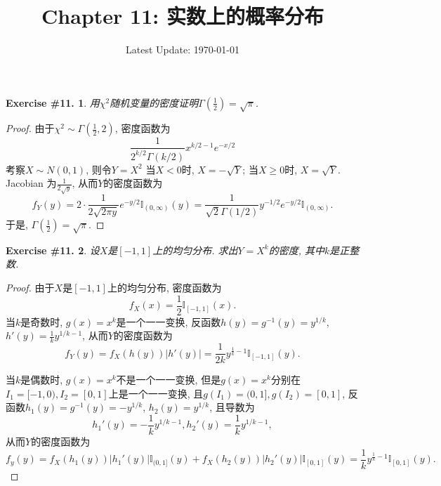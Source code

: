 \documentclass[UTF8, a4paper]{article}
\title{Chapter 11: 实数上的概率分布}
\author{}
\date{Latest Update: \today}
\newtheorem{exercise}{Exercise \#11.}
\begin{document}
\maketitle


\begin{framed}
\begin{exercise}
用\(\chi^2\)随机变量的密度证明\(\Gamma\left(\frac{1}{2}\right) = \sqrt{\pi}\).
\end{exercise}
\end{framed}

\begin{proof}
由于\(\chi^2 \sim \Gamma\left(\frac{1}{2}, 2\right)\), 密度函数为
$$
\frac{1}{2^{k / 2} \Gamma(k / 2)} x^{k / 2-1} e^{-x / 2}
$$
考察\(X \sim N(0, 1)\), 则令\(Y = X^2\)
当\(X < 0\)时, \(X = -\sqrt{Y}\); 当\(X \geq 0\)时, \(X = \sqrt{Y}\).
Jacobian 为\(\frac{1}{2\sqrt{y}}\), 从而\(Y\)的密度函数为
$$
f_Y(y) =2\cdot \frac{1}{2\sqrt{2\pi y}} e^{-y/2} \mathbb{I}_{(0, \infty)}(y) = \frac{1}{\sqrt{2} \Gamma(1/2)} y^{-1/2} e^{-y/2} \mathbb{I}_{(0,\infty)}.
$$
于是, \(\Gamma\left(\frac{1}{2}\right) = \sqrt{\pi}\).
\end{proof}


\begin{framed}
\begin{exercise}
设\(X\)是\([-1,1]\)上的均匀分布. 求出\(Y = X^k\)的密度, 其中\(k\)是正整数.
\end{exercise}
\end{framed}

\begin{proof}
由于\(X\)是\([-1,1]\)上的均匀分布, 密度函数为
$$
f_X(x) = \frac{1}{2} \mathbb{I}_{[-1,1]}(x).
$$
当\(k\)是奇数时, \(g(x) = x^k\)是一个一一变换, 
反函数\(h(y) = g^{-1}(y) = y^{1/k}\), 
\(h'(y) = \frac{1}{k} y^{1/k - 1}\),
从而\(Y\)的密度函数为
$$
f_Y(y) = f_X(h(y)) \left|h'(y)\right| = \frac{1}{2k}y^{\frac{1}{k} - 1} \mathbb{I}_{[-1,1]}(y).
$$

当\(k\)是偶数时, \(g(x) = x^k\)不是一个一一变换, 但是\(g(x) = x^k\)分别在\(I_1 = [-1,0), I_2 = [0,1]\)上是一个一一变换,
且\(g(I_1) = (0, 1], g(I_2) = [0, 1]\), 
反函数\(h_1(y) = g^{-1}(y) = -y^{1/k}\), \(h_2(y) = y^{1/k}\),
且导数为
$$
h_1'(y) = -\frac{1}{k} y^{1/k - 1}, h_2'(y) = \frac{1}{k} y^{1/k - 1},
$$
从而\(Y\)的密度函数为
$$
f_y(y) = f_X(h_1(y))|h_1'(y)| \mathbb{I}_{(0,1]}(y) + f_X(h_2(y))|h_2'(y)| \mathbb{I}_{[0,1]}(y) = \frac{1}{k}y^{\frac{1}{k} - 1} \mathbb{I}_{[0,1]}(y).
$$

\end{proof}
\end{document}

